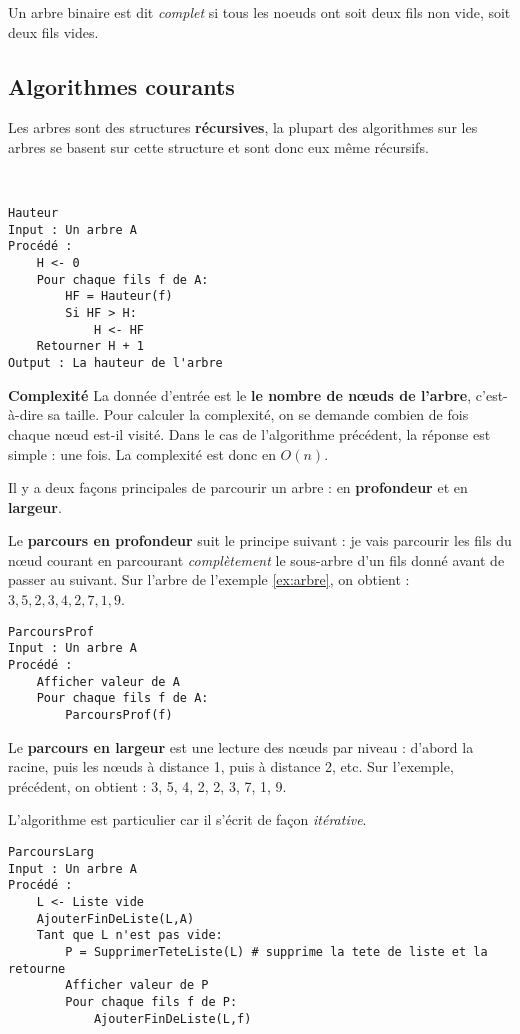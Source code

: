 \documentclass{../cours}
\begin{document}
\begin{Definition}
Un arbre binaire est dit \emph{complet} si tous les noeuds ont soit deux fils non vide, soit deux fils vides.
\end{Definition}

\subsection{Algorithmes courants}

Les arbres sont des structures \textbf{récursives}, la plupart des algorithmes sur les arbres se basent sur cette structure et sont donc eux même récursifs.

\begin{Example}

~
\begin{lstlisting}
Hauteur
Input : Un arbre A
Procédé :
    H <- 0
    Pour chaque fils f de A:
        HF = Hauteur(f)
        Si HF > H:
            H <- HF
    Retourner H + 1
Output : La hauteur de l'arbre
\end{lstlisting} 

\textbf{Complexité} La donnée d'entrée est le \textbf{le nombre de nœuds de l'arbre}, c'est-à-dire sa taille. Pour calculer la complexité, on se demande combien de fois chaque nœud est-il visité. Dans le cas de l'algorithme précédent, la réponse est simple : une fois. La complexité est donc en $O(n)$. 
\end{Example}

\begin{Example}
Il y a deux façons principales de parcourir un arbre : en \textbf{profondeur} et en \textbf{largeur}. 

Le \textbf{parcours en profondeur} suit le principe suivant : je vais parcourir les fils du nœud courant en parcourant \emph{complètement} le sous-arbre
d'un fils donné avant de passer au suivant. Sur l'arbre de l'exemple \ref{ex:arbre}, on obtient : $3, 5, 2, 3, 4, 2, 7, 1, 9$.

\begin{lstlisting}
ParcoursProf
Input : Un arbre A
Procédé :
    Afficher valeur de A
    Pour chaque fils f de A:
        ParcoursProf(f)
\end{lstlisting} 

Le \textbf{parcours en largeur} est une lecture des nœuds par niveau : d'abord la racine, puis les nœuds à distance 1, puis à distance 2, etc. Sur l'exemple, précédent, on obtient : 3, 5, 4, 2, 2, 3, 7, 1, 9.

L'algorithme est particulier car il s'écrit de façon \emph{itérative}. 

\begin{lstlisting}
ParcoursLarg
Input : Un arbre A
Procédé :
    L <- Liste vide
    AjouterFinDeListe(L,A)
    Tant que L n'est pas vide:
        P = SupprimerTeteListe(L) # supprime la tete de liste et la retourne
        Afficher valeur de P
        Pour chaque fils f de P:
            AjouterFinDeListe(L,f)
\end{lstlisting} 
\end{Example}
\end{document}
